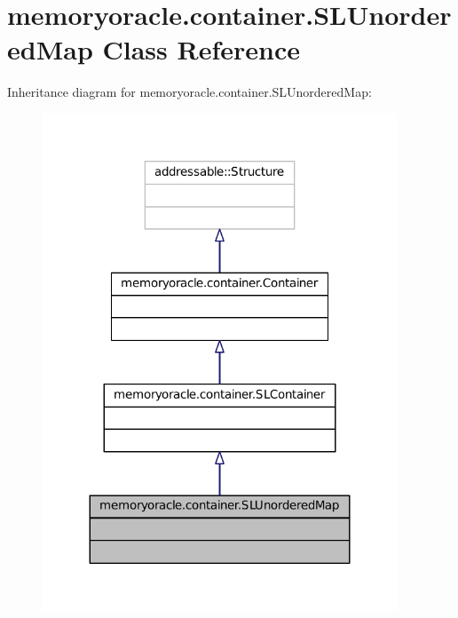 \hypertarget{classmemoryoracle_1_1container_1_1SLUnorderedMap}{}\section{memoryoracle.\+container.\+S\+L\+Unordered\+Map Class Reference}
\label{classmemoryoracle_1_1container_1_1SLUnorderedMap}


Inheritance diagram for memoryoracle.\+container.\+S\+L\+Unordered\+Map\+:\nopagebreak
\begin{figure}[H]
\begin{center}
\leavevmode
\includegraphics[width=299pt]{classmemoryoracle_1_1container_1_1SLUnorderedMap__inherit__graph}
\end{center}
\end{figure}


